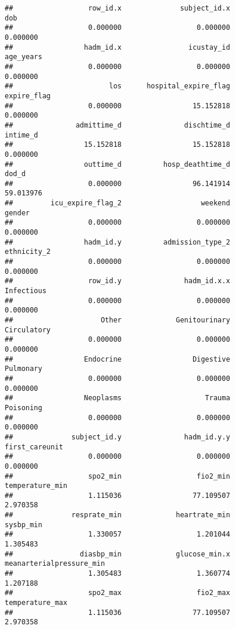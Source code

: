 \documentclass[
]{article}
\begin{document}
\begin{verbatim}
##                  row_id.x              subject_id.x                       dob 
##                  0.000000                  0.000000                  0.000000 
##                 hadm_id.x                icustay_id                 age_years 
##                  0.000000                  0.000000                  0.000000 
##                       los      hospital_expire_flag               expire_flag 
##                  0.000000                 15.152818                  0.000000 
##               admittime_d               dischtime_d                  intime_d 
##                 15.152818                 15.152818                  0.000000 
##                 outtime_d          hosp_deathtime_d                     dod_d 
##                  0.000000                 96.141914                 59.013976 
##         icu_expire_flag_2                   weekend                    gender 
##                  0.000000                  0.000000                  0.000000 
##                 hadm_id.y          admission_type_2               ethnicity_2 
##                  0.000000                  0.000000                  0.000000 
##                  row_id.y               hadm_id.x.x                Infectious 
##                  0.000000                  0.000000                  0.000000 
##                     Other             Genitourinary               Circulatory 
##                  0.000000                  0.000000                  0.000000 
##                 Endocrine                 Digestive                 Pulmonary 
##                  0.000000                  0.000000                  0.000000 
##                 Neoplasms                    Trauma                 Poisoning 
##                  0.000000                  0.000000                  0.000000 
##              subject_id.y               hadm_id.y.y            first_careunit 
##                  0.000000                  0.000000                  0.000000 
##                  spo2_min                  fio2_min           temperature_min 
##                  1.115036                 77.109507                  2.970358 
##              resprate_min             heartrate_min                 sysbp_min 
##                  1.330057                  1.201044                  1.305483 
##                diasbp_min             glucose_min.x  meanarterialpressure_min 
##                  1.305483                  1.360774                  1.207188 
##                  spo2_max                  fio2_max           temperature_max 
##                  1.115036                 77.109507                  2.970358 

\end{verbatim}
\end{document}
